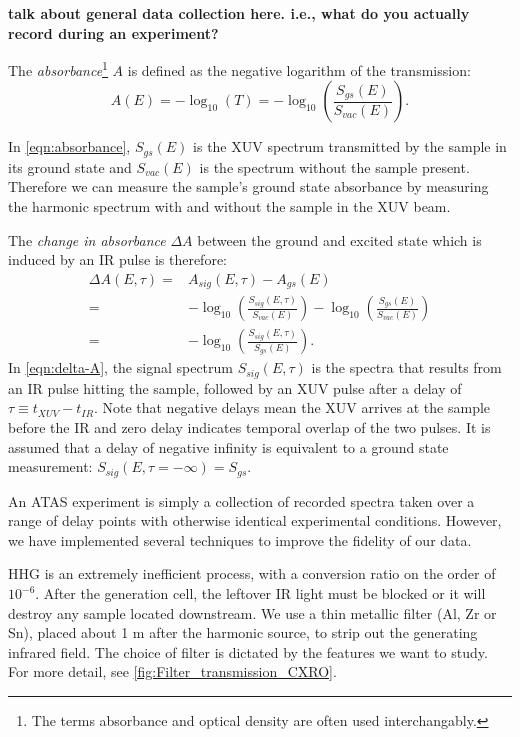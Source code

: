 \textbf{talk about general data collection here. i.e., what do you actually record during an experiment?}

The \textit{absorbance}\footnote{The terms absorbance and optical density are often used interchangably.} $A$ is defined as the negative logarithm of the transmission:
\begin{equation}
A(E) = -\log_{10} \left( T \right) = -\log_{10} \left(\frac{S_{gs}(E)}{S_{vac}(E)} \right).
\label{eqn:absorbance}
\end{equation}

In \cref{eqn:absorbance}, $S_{gs}(E)$ is the XUV spectrum transmitted by the sample in its ground state and $S_{vac}(E)$ is the spectrum without the sample present. Therefore we can measure the sample's ground state absorbance by measuring the harmonic spectrum with and without the sample in the XUV beam.

The \textit{change in absorbance} $\Delta A$ between the ground and excited state which is induced by an IR pulse is therefore:
\begin{equation}
\begin{aligned}
\Delta A(E,\tau) = & A_{sig}(E,\tau) - A_{gs}(E) \\
= & -\log_{10} \left(\frac{S_{sig}(E,\tau)}{S_{vac}(E)} \right) -  \log_{10} \left(\frac{S_{gs}(E)}{S_{vac}(E)} \right) \\
= & -\log_{10} \left(\frac{S_{sig}(E,\tau)}{S_{gs}(E)} \right).
\end{aligned}
\label{eqn:delta-A}
\end{equation}
In \cref{eqn:delta-A}, the signal spectrum $S_{sig}(E,\tau)$ is the spectra that results from an IR pulse hitting the sample, followed by an XUV pulse after a delay of $\tau \equiv t_{XUV} - t_{IR}$. Note that negative delays mean the XUV arrives at the sample before the IR and zero delay indicates temporal overlap of the two pulses. It is assumed that a delay of negative infinity is equivalent to a ground state measurement: $S_{sig}(E,\tau=-\infty) = S_{gs}$.

An ATAS experiment is simply a collection of recorded spectra taken over a range of delay points with otherwise identical experimental conditions. However, we have implemented several techniques to improve the fidelity of our data.

HHG is an extremely inefficient process, with a conversion ratio on the order of $10^{-6}$. After the generation cell, the leftover IR light must be blocked or it will destroy any sample located downstream. We use a thin metallic filter (Al, Zr or Sn), placed about 1 m after the harmonic source, to strip out the generating infrared field. The choice of filter is dictated by the features we want to study. For more detail, see \cref{fig:Filter_transmission_CXRO}.

